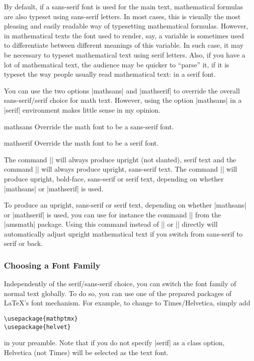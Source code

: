 By default, if a sans-serif font is used for the main text,
mathematical formulas are also typeset using sans-serif letters. In
most cases, this is visually the most pleasing and easily readable way of
typesetting mathematical formulas. However, in mathematical texts the
font used to render, say, a variable is sometimes used to
differentiate between different meanings of this variable. In such
case, it may be necessary to typeset mathematical text using serif
letters. Also, if you have a lot of mathematical text, the audience
may be quicker to ``parse'' it, if it is typeset the way people
usually read mathematical text: in a serif font.

You can use the two options |mathsans| and |mathserif| to override the
overall sans-serif/serif choice for math text. However, using the option
|mathsans| in a |serif| environment makes little sense in my opinion.

\begin{classoption}{mathsans}
  Override the math font to be a sans-serif font.
\end{classoption}

\begin{classoption}{mathserif}
  Override the math font to be a serif font.
\end{classoption}

The command |\mathrm| will always produce upright (not slanted), serif
text and the command |\mathsf| will always produce upright, sans-serif
text. The command |\mathbf| will produce upright, bold-face,
sans-serif or serif text, depending on whether |mathsans| or
|mathserif| is used.

To produce an upright, sans-serif or serif text, depending on
whether |mathsans| or |mathserif| is used, you can use for instance
the command |\operatorname| from the |amsmath| package. Using this
command instead of |\mathrm| or |\mathsf| directly will  automatically
adjust  upright mathematical text if you switch from sans-serif to
serif or back.




\subsubsection{Choosing a Font Family}

\label{section-substition}

Independently of the serif/sans-serif choice, you can switch the font
family of normal text globally. To do so, you can use one of the
prepared packages of \LaTeX's font mechanism. For example, to change
to Times/Helvetica, simply add 
\begin{verbatim}
\usepackage{mathptmx}
\usepackage{helvet}
\end{verbatim}
in your preamble. Note that if you do not specify |serif| as a
class option, Helvetica (not Times) will be selected as the text
font.

